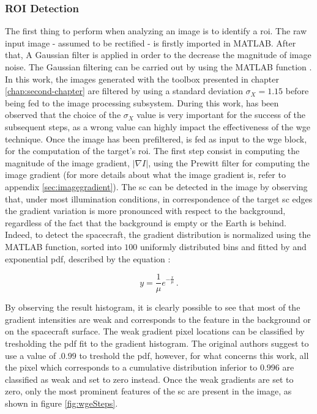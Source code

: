 \subsubsection{ROI Detection}
The first thing to perform when analyzing an image is to identify a \acrshort{roi}.
The raw input image - assumed to be rectified - is firstly imported in MATLAB. After that, A Gaussian filter is applied in order to the decrease the magnitude of image noise. The Gaussian filtering can be carried out by using the MATLAB function . In this work, the images generated with the toolbox presented in chapter \ref{chap:second-chapter} are filtered by using a standard deviation $\sigma_X = 1.15$ before being fed to the image processing subsystem. During this work, has been observed that the choice of the $\sigma_X$ value is very important for the success of the subsequent steps, as a wrong value can highly impact the effectiveness of the \acrshort{wge} technique. Once the image has been prefiltered, is fed as input to the \acrshort{wge} block, for the computation of the target's \acrshort{roi}. The first step consist in computing the magnitude of the image gradient, $|\nabla I|$,  using the Prewitt filter for computing the image gradient (for more details about what the image gradient is, refer to appendix \ref{sec:imagegradient}).
The \acrshort{sc} can be detected in the image by observing that, under most illumination conditions, in correspondence of the target \acrshort{sc} edges the gradient variation is more pronounced with respect to the background, regardless of the fact that the background is empty or the Earth is behind.
Indeed, to detect the spacecraft, the gradient distribution is normalized using the MATLAB  function, sorted into $100$ uniformly distributed bins and fitted by and exponential \acrfull{pdf}, described by the equation :

\begin{equation*}
  y = \frac{1}{\mu} e^{-\frac{x}{\mu}} \,.
\end{equation*}

By observing the result histogram, it is clearly possible to see that most of the gradient intensities are weak and corresponds to the feature in the background or on the spacecraft surface. The weak gradient pixel locations can be classified by tresholding the \acrshort{pdf} fit to the gradient histogram. The original authors suggest to use a value of $.0.99$ to treshold the \acrshort{pdf}, however, for what concerns this work, all the pixel which corresponds to a cumulative distribution inferior to $0.996$ are classified as weak and set to zero instead. Once the weak gradients are set to zero, only the most prominent features of the \acrshort{sc} are present in the image, as shown in figure \ref{fig:wgeSteps}.

